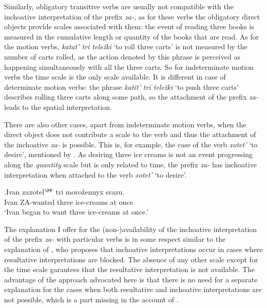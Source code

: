 Similarly, obligatory transitive verbs are usually not compatible with the inchoative interpretation of the prefix \textit{za-}, as for these verbs the obligatory direct objects provide scales associated with them: the event of reading three books is measured in the cumulative length or quantity of the books that are read. As for the motion verbs, \textit{katat' tri tele\v{z}ki} `to roll three carts' is not measured by the number of carts rolled, as the action denoted by this phrase is perceived as happening simultaneously with all the three carts. So for indeterminate motion verbs the time scale is the only scale available. It is different in case of determinate motion verbs: the phrase \textit{katit' tri tele\v{z}ki} `to push three carts' describes rolling three carts along some path, so the attachment of the prefix \textit{za-} leads to the spatial interpretation.

There are also other cases, apart from indeterminate motion verbs, when the direct object does not contribute a scale to the verb and thus the attachment of the inchoative \textit{za-} is possible. This is, for example, the case of the verb \textit{xotet'} `to desire', mentioned by \citet{Braginsky:08}. As desiring three ice creams is not an event progressing along the \textit{quantity} scale but is only related to time, the prefix \textit{za-} has inchoative interpretation when attached to the verb \textit{xotet'} `to desire'.

\exg.\label{ex:zaxotet}Ivan zaxotel$^{\PF}$ tri moro\v{z}ennyx srazu.\\
Ivan ZA-wanted three ice-creams {at once}\\
\trans `Ivan began to want three ice-creams at once.'
\\

The explanation I offer for the (non-)availability of the inchoative interpretation of the prefix \textit{za-} with particular verbs is in some respect similar to the explanation of \citet{Braginsky:08}, who proposes that inchoative interpretations occur in cases where resultative interpretations are blocked. The absence of any other scale except for the time scale garantees that the resultative interpretation is not available. The advantage of the approach advocated here is that there is no need for a separate explanation for the cases when both resultative and inchoative interpretations are not possible, which is a part missing in the account of \citet{Braginsky:08}.

